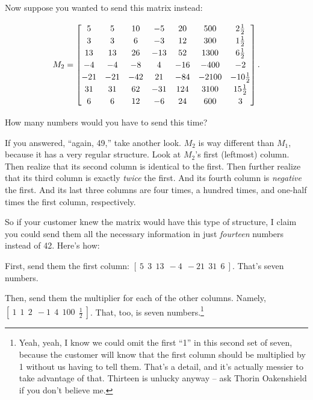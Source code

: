 \begin{alttitles}
\medskip

Now suppose you wanted to send this matrix instead:

\vspace{-.15in}
\begin{align*}
M_2 = 
\begingroup
\renewcommand*{\arraystretch}{1.2}
\begin{bmatrix}
5 & 5 & 10 & -5 & 20 & 500 & 2\frac{1}{2} \\
3 & 3 & 6 & -3 & 12 & 300 & 1\frac{1}{2} \\
13 & 13 & 26 & -13 & 52 & 1300 & 6\frac{1}{2} \\
-4 & -4 & -8 & 4 & -16 & -400 & -2 \\
-21 & -21 & -42 & 21 & -84 & -2100 & -10\frac{1}{2} \\
31 & 31 & 62 & -31 & 124 & 3100 & 15\frac{1}{2} \\
6 & 6 & 12 & -6 & 24 & 600 & 3 \\
\end{bmatrix}.
\endgroup
\end{align*}
\vspace{-.15in}

How many numbers would you have to send this time?

If you answered, ``again, 49,'' take another look. $M_2$ is way different than
$M_1$, because it has a very regular structure. Look at $M_2$'s first
(leftmost) column. Then realize that its second column is identical to the
first. Then further realize that its third column is exactly \textit{twice} the
first. And its fourth column is \textit{negative} the first. And its last three
columns are four times, a hundred times, and one-half times the first column,
respectively.

So if your customer knew the matrix would have this type of structure, I claim
you could send them all the necessary information in just \textit{fourteen}
numbers instead of 42. Here's how:

\begin{compactenum}
\item First, send them the first column: $[\ 5\ \ 3\ \ 13\ \ -4\ \ -21\ \ 31\ \
6\ ]$. That's seven numbers.
\item Then, send them the multiplier for each of the other columns. Namely, $[\
1\ \ 1\ \ 2\ \ -1\ \ 4\ \ 100\ \ \frac{1}{2}\ ]$. That, too, is seven
numbers.\footnote{Yeah, yeah, I know we could omit the first ``1'' in this
second set of seven, because the customer will know that the first column
should be multiplied by 1 without us having to tell them. That's a detail, and
it's actually messier to take advantage of that. Thirteen is unlucky anyway --
ask Thorin Oakenshield if you don't believe me.}


\end{compactenum}
\end{alttitles}
